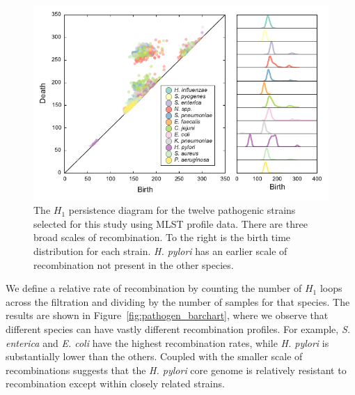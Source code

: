 \begin{figure}
\centering
\includegraphics[width=\textwidth]{./fig/pathogen_persistence_diagram.pdf}
\caption[$H_1$ persistence diagram for twelve pathogenic strains using MLST profile data]{The $H_1$ persistence diagram for the twelve pathogenic strains selected for this study using MLST profile data. There are three broad scales of recombination. To the right is the birth time distribution for each strain. \emph{H. pylori} has an earlier scale of recombination not present in the other species.}
\label{fig:pathogen_persistence_diagram}
\end{figure}

We define a relative rate of recombination by counting the number of $H_1$ loops across the filtration and dividing by the number of samples for that species.
The results are shown in Figure~\ref{fig:pathogen_barchart}, where we observe that different species can have vastly different recombination profiles.
For example, \emph{S. enterica} and \emph{E. coli} have the highest recombination rates, while \emph{H. pylori} is substantially lower than the others.
Coupled with the smaller scale of recombinations suggests that the \emph{H. pylori} core genome is relatively resistant to recombination except within closely related strains.

